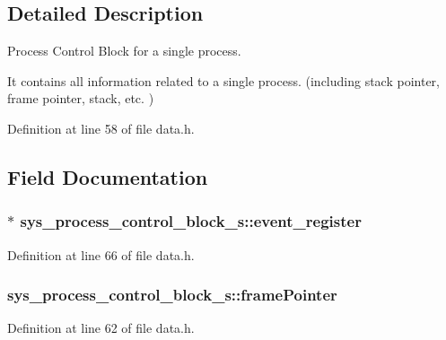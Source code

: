 \subsection{Detailed Description}
Process Control Block for a single process. 

It contains all information related to a single process. (including stack pointer, frame pointer, stack, etc. ) 

Definition at line 58 of file data.\+h.



\subsection{Field Documentation}
\hypertarget{structsys__process__control__block__s_a85bf797910e44aee733a9cc53db76728}{}
\subsubsection[{event\+\_\+register}]{$\ast$ sys\+\_\+process\+\_\+control\+\_\+block\+\_\+s\+::event\+\_\+register}\label{structsys__process__control__block__s_a85bf797910e44aee733a9cc53db76728}


Definition at line 66 of file data.\+h.

\hypertarget{structsys__process__control__block__s_aef61433a4fe380bd38c45fe3ea36433c}{}
\subsubsection[{frame\+Pointer}]{ sys\+\_\+process\+\_\+control\+\_\+block\+\_\+s\+::frame\+Pointer}\label{structsys__process__control__block__s_aef61433a4fe380bd38c45fe3ea36433c}


Definition at line 62 of file data.\+h.

\hypertarget{structsys__process__control__block__s_a3f7ec6be0e16d1ae6b123a9b2bbb7176}{}
